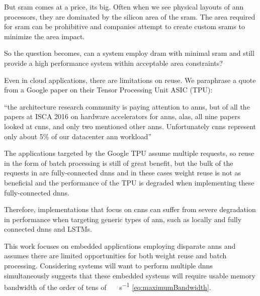 But \ac{sram} comes at a price, its big. Often when we see physical layouts of \ac{ann} processors, they are dominated by the silicon area of the \ac{sram}. The area required for \ac{sram} can be prohibitive and companies attempt to create custom \acp{sram} to minimize the area impact.

So the question becomes, can a system employ \ac{dram} with minimal \ac{sram} and still provide a high performance system within acceptable area constraints?

\iffalse
We believe a system can be designed with \ac{dram} as the primary processing store. This will require careful use of data structures to describe storage within \ac{dram} to ensure we make good use of the potential bandwidth. But there are other benefits we will take advantage of, but more about that later.
\fi

\iffalse
There important application is disparate \ac{ann}s because specifically a form of \ac{dnn}, Convolutional Neural networks (\ac{cnn}) have gotten good press recently, but they are not the only \ac{dnn}.
\fi

Even in cloud applications, there are limitations on reuse. We paraphrase a quote from a Google paper \cite{tensorflow2015-whitepaper} on their Tensor Processing Unit ASIC (TPU):

\hyphenquote{american}{the architecture research community is paying attention to \acp{ann}, but of all the papers at ISCA 2016 on hardware accelerators for \acp{ann}, alas, all nine papers looked at \ac{cnn}s, and only two mentioned other \acp{ann}. Unfortunately \ac{cnn}s represent only about 5\% of our datacenter \ac{ann} workload}

The applications targeted by the Google TPU \cite{tensorflow2015-whitepaper} assume multiple requests, so reuse in the form of batch processing is still of great benefit, but the bulk of the requests in \cite{tensorflow2015-whitepaper} are fully-connected \ac{dnn}s and in these cases weight reuse is not as beneficial and the performance of the TPU is degraded when implementing these fully-connected \ac{dnn}s.

Therefore, implementations that focus on \ac{cnn}s can suffer from severe degradation in performance when targeting generic types of \ac{ann}, such as locally and fully connected \ac{dnn}s and LSTMs.

This work focuses on embedded applications employing disparate \ac{ann}s and assumes there are limited opportunities for both weight reuse and batch processing.
Considering systems will want to perform multiple \ac{dnn}s simultaneously suggests that these embedded systems will require usable memory bandwidth of the order of tens of \SI[per-mode=symbol]{}{\tera \bit \per \second} \eqref{eq:maximumBandwidth}.

